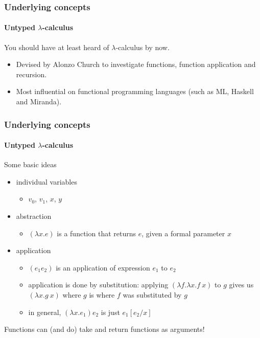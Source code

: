 \documentclass{beamer}
\begin{document}
\begin{frame}
  \frametitle{Underlying concepts}
  \framesubtitle{Untyped $\lambda$-calculus }
  You should have at least heard of $\lambda$-calculus by now.
  \pause
  \begin{itemize}[<+->]
    \item Devised by Alonzo Church to investigate functions, function
      application and recursion.
    \item Most influential on functional programming languages (such as ML,
      Haskell and Miranda).
  \end{itemize}
\end{frame}
\begin{frame}
  \frametitle{Underlying concepts}
  \framesubtitle{Untyped $\lambda$-calculus }
  Some basic ideas
  \pause
  \begin{itemize}[<+->]
    \item individual variables
      \begin{itemize}
        \item $v_0$, $v_1$, $x$, $y$
      \end{itemize}
    \item abstraction
      \begin{itemize}
        \item $(\lambda x.e)$ is a function that returns $e$, given a
          formal parameter $x$
      \end{itemize}
    \item application
      \begin{itemize}
        \item $(e_1e_2)$ is an application of expression $e_1$ to
          $e_2$
        \item application is done by substitution: applying $(\lambda f.\lambda
          x.f\:x)$ to $g$ gives us $(\lambda x.g\:x)$ where $g$ is
          where $f$ was substituted by $g$
        \item in general, $(\lambda x.e_1)e_2$ is just $e_1[e_2/x]$
      \end{itemize}
  \end{itemize}
  \pause
  Functions can (and do) take and return functions as arguments!
\end{frame}
\end{document}
